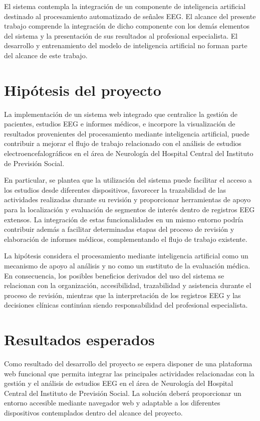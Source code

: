 El sistema contempla la integración de un componente de inteligencia
artificial destinado al procesamiento automatizado de señales EEG.
El alcance del presente trabajo comprende la integración de dicho
componente con los demás elementos del sistema y la presentación de
sus resultados al profesional especialista. El desarrollo y
entrenamiento del modelo de inteligencia artificial no forman parte
del alcance de este trabajo.

\section{Hipótesis del proyecto}
\label{sec:hipotesis}

La implementación de un sistema web integrado que centralice la gestión de
pacientes, estudios EEG e informes médicos, e incorpore la visualización de
resultados provenientes del procesamiento mediante inteligencia artificial,
puede contribuir a mejorar el flujo de trabajo relacionado con el análisis
de estudios electroencefalográficos en el área de Neurología del Hospital
Central del Instituto de Previsión Social.

En particular, se plantea que la utilización del sistema puede facilitar el
acceso a los estudios desde diferentes dispositivos, favorecer la
trazabilidad de las actividades realizadas durante su revisión y proporcionar
herramientas de apoyo para la localización y evaluación de segmentos de
interés dentro de registros EEG extensos. La integración de estas
funcionalidades en un mismo entorno podría contribuir además a facilitar
determinadas etapas del proceso de revisión y elaboración de informes
médicos, complementando el flujo de trabajo existente.

La hipótesis considera el procesamiento mediante inteligencia artificial como
un mecanismo de apoyo al análisis y no como un sustituto de la evaluación
médica. En consecuencia, los posibles beneficios derivados del uso del
sistema se relacionan con la organización, accesibilidad, trazabilidad y
asistencia durante el proceso de revisión, mientras que la interpretación de
los registros EEG y las decisiones clínicas continúan siendo responsabilidad
del profesional especialista.

\section{Resultados esperados}
\label{sec:resultados-esperados}

Como resultado del desarrollo del proyecto se espera disponer de una
plataforma web funcional que permita integrar las principales actividades
relacionadas con la gestión y el análisis de estudios EEG en el área de
Neurología del Hospital Central del Instituto de Previsión Social. La
solución deberá proporcionar un entorno accesible mediante navegador web
y adaptable a los diferentes dispositivos contemplados dentro del alcance
del proyecto.

